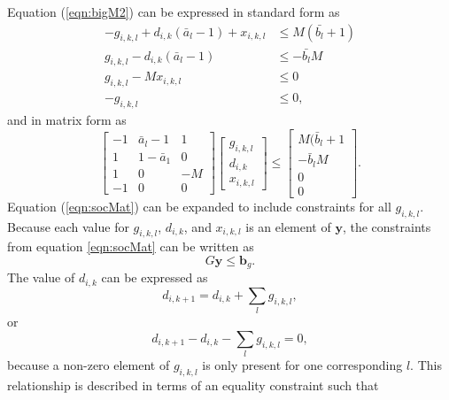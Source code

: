 \par Equation (\ref{eqn:bigM2}) can be expressed in standard form as 
\begin{equation}\label{eqn:chargeConstraints}
	\begin{aligned} 
		-g_{i,k,l} + d_{i,k}(\bar{a}_l - 1) + x_{i,k,l} &\le M(\bar{b_l} + 1) \\
		 g_{i,k,l} - d_{i,k}(\bar{a}_l - 1)  &\le  - \bar{b_l}M \\
		 g_{i,k,l} - Mx_{i,k,l} &\le 0 \\
		-g_{i,k,l} &\le 0,  
	\end{aligned}
\end{equation} 
and in matrix form as
\begin{equation}\label{eqn:socMat}
	\begin{bmatrix}
		-1 & \bar{a}_l - 1 & 1 \\
		1 & 1 - \bar{a}_1 & 0\\
		1 & 0 & -M \\
		-1 & 0 & 0
	\end{bmatrix}
	\begin{bmatrix}
		g_{i,k,l} \\
		d_{i,k}\\
		x_{i,k,l}
	\end{bmatrix}
	\le 
	\begin{bmatrix}
		M(\bar{b}_l + 1 \\
		-\bar{b}_lM\\
		0\\
		0
	\end{bmatrix}.
\end{equation}
Equation (\ref{eqn:socMat}) can be expanded to include constraints for all $g_{i,k,l}$.  Because each value for $g_{i,k,l}$, $d_{i,k}$, and $x_{i,k,l}$ is an element of $\mathbf{y}$, the constraints from equation \ref{eqn:socMat} can be written as 
\begin{equation}\label{eqn:dSocMat}
	G\mathbf{y} \le \mathbf{b}_g.
\end{equation}
The value of $d_{i,k}$ can be expressed as 
\begin{equation}\label{eqn:totalG}
	d_{i,k + 1} = d_{i,k} + \sum_l g_{i,k,l}, 
\end{equation}
or 
\begin{equation}
	d_{i,k + 1} - d_{i,k} - \sum_l g_{i,k,l} = 0,
\end{equation}
because a non-zero element of $g_{i,k,l}$ is only present for one corresponding $l$. This relationship is described in terms of an equality constraint such that
